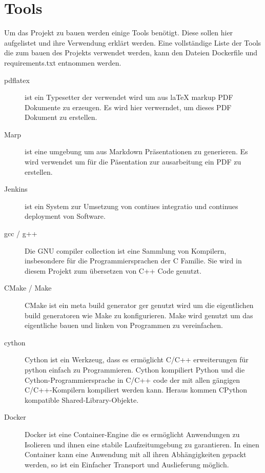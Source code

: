 \chapter*{Tools}
\label{chap:tools}

Um das Projekt zu bauen werden einige Tools benötigt. Diese sollen hier aufgelistet und ihre Verwendung erklärt werden.
Eine vollständige Liste der Tools die zum bauen des Projekts verwendet werden, kann den Dateien \glqq Dockerfile \grqq{} und \glqq requirements.txt \grqq{} entnommen werden.

\begin{description}
    \item[pdflatex] ist ein Typesetter der verwendet wird um aus laTeX markup PDF Dokumente zu erzeugen. Es wird hier verwerndet, um dieses PDF Dokument zu erstellen.\cite{MANLATEX}
    \item[Marp] ist eine  umgebung um aus Markdown Präsentationen zu generieren. Es wird verwendet um für die Päsentation zur ausarbeitung ein PDF zu erstellen.
    \item[Jenkins] ist ein System zur Umsetzung von \glqq contiues integratio \grqq{} und \glqq continues deployment\grqq{} von Software.
    \item[gcc / g++] Die GNU compiler collection ist eine Sammlung von Kompilern, insbesondere für die Programmiersprachen der C Familie. Sie wird in diesem Projekt zum übersetzen von C++ Code genutzt.
    \item[CMake / Make] CMake ist ein meta build generator ger genutzt wird um die eigentlichen build generatoren wie Make zu konfigurieren. Make wird genutzt um das eigentliche bauen und linken von Programmen zu vereinfachen.
    \item[cython] Cython ist ein Werkzeug, dass es ermöglicht C/C++ erweiterungen für python einfach zu Programmieren. Cython kompiliert Python und die Cython-Programmiersprache in C/C++ code der mit allen gängigen C/C++-Kompilern kompiliert werden kann. Heraus kommen CPython kompatible Shared-Library-Objekte.
    \item[Docker] Docker ist eine Container-Engine die es ermöglicht Anwendungen zu Isolieren und ihnen eine stabile Laufzeitumgebung zu garantieren. In einen Container kann eine Anwendung mit all ihren Abhängigkeiten gepackt werden, so ist ein Einfacher Transport und Auslieferung möglich.
\end{description}
